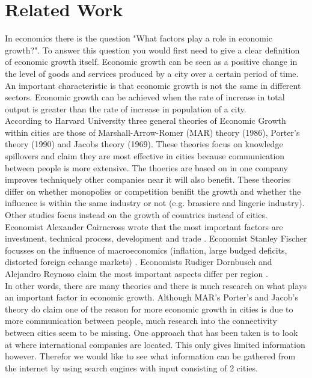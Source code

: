 \section{Related Work}

In economics there is the question "What factors play a role in economic growth?". To answer this question you would first need to give a clear definition of economic growth itself. Economic growth can be seen as a positive change in the level of goods and services produced by a city over a certain period of time. An important characteristic is that economic growth is not the same in different sectors. Economic growth can be achieved when the rate of increase in total output is greater than the rate of increase in population of a city. \\

According to Harvard University three general theories of Economic Growth within cities \cite{glaeser1992growth} are those of Marshall-Arrow-Romer (MAR) theory (1986), Porter's theory (1990) and Jacobs theory (1969). These theories focus on knowledge spillovers and claim they are most effective in cities because communication between people is more extensive. The thoeries are based on in one company improves techniquely other companies near it will also benefit. These theories differ on whether monopolies or competition benifit the growth and whether the influence is within the same industry or not (e.g. brassiere and lingerie industry). \\
Other studies focus instead on the growth of countries instead of cities. Economist Alexander Cairncross wrote that the most important factors are investment, technical process, development and trade \cite{cairncross2013factors}. Economist Stanley Fischer focusses on the influence of macroeconomics (inflation, large budged deficits, distorted foreign echange markets) \cite{fischer1993role}. Economists Rudiger Dornbusch and Alejandro Reynoso claim the most important aspects differ per region \cite{dornbusch1989financial}. \\
In other words, there are many theories and there is much research on what plays an important factor in economic growth. Although MAR's Porter's and Jacob's theory do claim one of the reason for more economic growth in cities is due to more communication between people, much research into the connectivity between cities seem to be missing. One approach that has been taken is to look at where international companies are located. This only gives limited information however. Therefor we would like to see what information can be gathered from the internet by using search engines with input consisting of 2 cities.